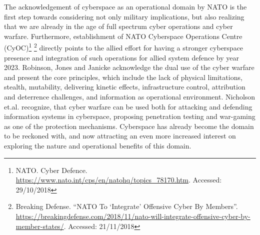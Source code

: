 The acknowledgement of cyberspace as an operational domain by NATO \cite{CCDCOE2016} is the first step towards considering not only military implications, but also realizing that we are already in the age of full spectrum cyber operations and cyber warfare. Furthermore, establishment of NATO Cyberspace Operations Centre (CyOC)\footnote{NATO. Cyber Defence. \url{https://www.nato.int/cps/en/natohq/topics_78170.htm}. Accessed: 29/10/2018} \footnote{Breaking Defense. ``NATO To ‘Integrate’ Offensive Cyber By Members''. \url{https://breakingdefense.com/2018/11/nato-will-integrate-offensive-cyber-by-member-states/}. Accessed: 21/11/2018} directly points to the allied effort for having a stronger cyberspace presence and integration of such operations for allied system defence by year 2023.
Robinson, Jones and Janicke \cite{Robinson2015} acknowledge the dual use of the cyber warfare and present the core principles, which include the lack of physical limitations, stealth, mutability, delivering kinetic effects, infrastructure control, attribution and deterrence challenges, and information as operational environment.
Nicholson et.al. \cite{Nicholson2012} recognize, that cyber warfare can be used both for attacking and defending information systems in cyberspace, proposing penetration testing and war-gaming as one of the protection mechanisms.
Cyberspace has already become the domain to be reckoned with, and now attracting an even more increased interest on exploring the nature and operational benefits of this domain.

